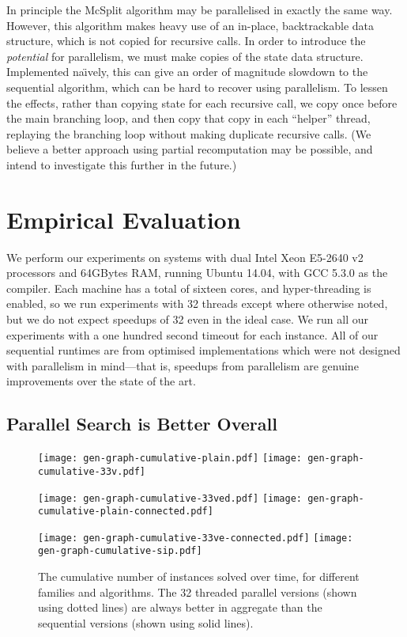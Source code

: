 \documentclass{llncs}
\begin{document}
In principle the McSplit algorithm may be parallelised in exactly the same way. However, this
algorithm makes heavy use of an in-place, backtrackable data structure, which is not copied for
recursive calls. In order to introduce the \emph{potential} for parallelism, we must make
copies of the state data structure. Implemented na{\"\i}vely, this can give an order of magnitude
slowdown to the sequential algorithm, which can be hard to recover using parallelism. To lessen the
effects, rather than copying state for each recursive call, we copy once before the main branching
loop, and then copy that copy in each ``helper'' thread, replaying the branching loop without making
duplicate recursive calls.  (We believe a better approach using partial recomputation may be
possible, and intend to investigate this further in the future.)

\section{Empirical Evaluation}

We perform our experiments on systems with dual Intel Xeon E5-2640 v2 processors and 64GBytes RAM,
running Ubuntu 14.04, with GCC 5.3.0 as the compiler. Each machine has a total of sixteen cores, and
hyper-threading is enabled, so we run experiments with 32 threads except where otherwise noted, but
we do not expect speedups of 32 even in the ideal case.  We run all our experiments with a one
hundred second timeout for each instance. All of our sequential runtimes are from optimised
implementations which were not designed with parallelism in mind---that is, speedups from
parallelism are genuine improvements over the state of the art.

\subsection{Parallel Search is Better Overall}

\begin{figure}[p]
    \texttt{[image: gen-graph-cumulative-plain.pdf]}
    \hfill
    \texttt{[image: gen-graph-cumulative-33v.pdf]}

    \vspace*{1em}

    \texttt{[image: gen-graph-cumulative-33ved.pdf]}
    \hfill
    \texttt{[image: gen-graph-cumulative-plain-connected.pdf]}

    \vspace*{1em}

    \texttt{[image: gen-graph-cumulative-33ve-connected.pdf]}
    \hfill
    \texttt{[image: gen-graph-cumulative-sip.pdf]}

    \caption{The cumulative number of instances solved over time, for different families and
    algorithms. The 32 threaded parallel versions (shown using dotted lines) are always better in
aggregate than the sequential versions (shown using solid lines).}\label{figure:cumulative}
\end{figure}
\end{document}
